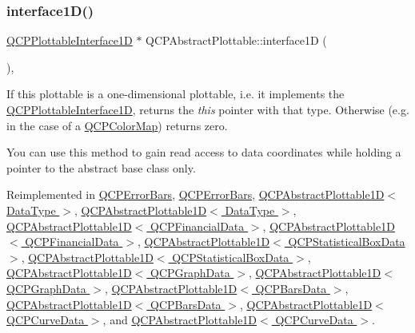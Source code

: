 \subsubsection{\texorpdfstring{interface1\+D()}{interface1D()}}
{\footnotesize\ttfamily \hyperlink{class_q_c_p_plottable_interface1_d}{Q\+C\+P\+Plottable\+Interface1D} $\ast$ Q\+C\+P\+Abstract\+Plottable\+::interface1D (\begin{DoxyParamCaption}{ }\end{DoxyParamCaption})\hspace{0.3cm}{\ttfamily [inline]}, {\ttfamily [virtual]}}

If this plottable is a one-\/dimensional plottable, i.\+e. it implements the \hyperlink{class_q_c_p_plottable_interface1_d}{Q\+C\+P\+Plottable\+Interface1D}, returns the {\itshape this} pointer with that type. Otherwise (e.\+g. in the case of a \hyperlink{class_q_c_p_color_map}{Q\+C\+P\+Color\+Map}) returns zero.

You can use this method to gain read access to data coordinates while holding a pointer to the abstract base class only. 

Reimplemented in \hyperlink{class_q_c_p_error_bars_a0b6fbf3a943b4241ee485d066cc8562a}{Q\+C\+P\+Error\+Bars}, \hyperlink{class_q_c_p_error_bars_a0b6fbf3a943b4241ee485d066cc8562a}{Q\+C\+P\+Error\+Bars}, \hyperlink{class_q_c_p_abstract_plottable1_d_a3ab7511c279af967955369606c584dd6}{Q\+C\+P\+Abstract\+Plottable1\+D$<$ Data\+Type $>$}, \hyperlink{class_q_c_p_abstract_plottable1_d_ab5f14406cf661087a8ed87baea37bc7e}{Q\+C\+P\+Abstract\+Plottable1\+D$<$ Data\+Type $>$}, \hyperlink{class_q_c_p_abstract_plottable1_d_a3ab7511c279af967955369606c584dd6}{Q\+C\+P\+Abstract\+Plottable1\+D$<$ Q\+C\+P\+Financial\+Data $>$}, \hyperlink{class_q_c_p_abstract_plottable1_d_ab5f14406cf661087a8ed87baea37bc7e}{Q\+C\+P\+Abstract\+Plottable1\+D$<$ Q\+C\+P\+Financial\+Data $>$}, \hyperlink{class_q_c_p_abstract_plottable1_d_a3ab7511c279af967955369606c584dd6}{Q\+C\+P\+Abstract\+Plottable1\+D$<$ Q\+C\+P\+Statistical\+Box\+Data $>$}, \hyperlink{class_q_c_p_abstract_plottable1_d_ab5f14406cf661087a8ed87baea37bc7e}{Q\+C\+P\+Abstract\+Plottable1\+D$<$ Q\+C\+P\+Statistical\+Box\+Data $>$}, \hyperlink{class_q_c_p_abstract_plottable1_d_a3ab7511c279af967955369606c584dd6}{Q\+C\+P\+Abstract\+Plottable1\+D$<$ Q\+C\+P\+Graph\+Data $>$}, \hyperlink{class_q_c_p_abstract_plottable1_d_ab5f14406cf661087a8ed87baea37bc7e}{Q\+C\+P\+Abstract\+Plottable1\+D$<$ Q\+C\+P\+Graph\+Data $>$}, \hyperlink{class_q_c_p_abstract_plottable1_d_a3ab7511c279af967955369606c584dd6}{Q\+C\+P\+Abstract\+Plottable1\+D$<$ Q\+C\+P\+Bars\+Data $>$}, \hyperlink{class_q_c_p_abstract_plottable1_d_ab5f14406cf661087a8ed87baea37bc7e}{Q\+C\+P\+Abstract\+Plottable1\+D$<$ Q\+C\+P\+Bars\+Data $>$}, \hyperlink{class_q_c_p_abstract_plottable1_d_a3ab7511c279af967955369606c584dd6}{Q\+C\+P\+Abstract\+Plottable1\+D$<$ Q\+C\+P\+Curve\+Data $>$}, and \hyperlink{class_q_c_p_abstract_plottable1_d_ab5f14406cf661087a8ed87baea37bc7e}{Q\+C\+P\+Abstract\+Plottable1\+D$<$ Q\+C\+P\+Curve\+Data $>$}.

